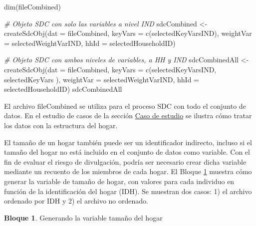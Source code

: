 \documentclass[
]{book}
\newenvironment{Shaded}{\begin{snugshade}}{\end{snugshade}}
\newcommand{\AttributeTok}[1]{\textcolor[rgb]{0.77,0.63,0.00}{#1}}
\newcommand{\CommentTok}[1]{\textcolor[rgb]{0.56,0.35,0.01}{\textit{#1}}}
\newcommand{\FunctionTok}[1]{\textcolor[rgb]{0.00,0.00,0.00}{#1}}
\newcommand{\NormalTok}[1]{#1}
\newcommand{\OtherTok}[1]{\textcolor[rgb]{0.56,0.35,0.01}{#1}}
\theoremstyle{definition}
\theoremstyle{definition}
\newtheorem{example}{Bloque}[chapter]
\theoremstyle{definition}
\theoremstyle{definition}
\theoremstyle{remark}
\begin{document}
\begin{Shaded}
\begin{Highlighting}[]
\FunctionTok{dim}\NormalTok{(fileCombined)}

\CommentTok{\# Objeto SDC con solo las variables a nivel IND}
\NormalTok{sdcCombined }\OtherTok{\textless{}{-}} \FunctionTok{createSdcObj}\NormalTok{(}\AttributeTok{dat =}\NormalTok{ fileCombined, }\AttributeTok{keyVars =} \FunctionTok{c}\NormalTok{(selectedKeyVarsIND),}
                            \AttributeTok{weightVar =}\NormalTok{ selectedWeightVarIND, }\AttributeTok{hhId =}\NormalTok{ selectedHouseholdID)}

\CommentTok{\# Objeto SDC con ambos niveles de variables, a HH y IND}
\NormalTok{sdcCombinedAll }\OtherTok{\textless{}{-}} \FunctionTok{createSdcObj}\NormalTok{(}\AttributeTok{dat =}\NormalTok{ fileCombined,}
                               \AttributeTok{keyVars =} \FunctionTok{c}\NormalTok{(selectedKeyVarsIND, selectedKeyVars ),}
                               \AttributeTok{weightVar =}\NormalTok{ selectedWeightVarIND, }
                               \AttributeTok{hhId =}\NormalTok{ selectedHouseholdID)}
\NormalTok{sdcCombinedAll}
\end{Highlighting}
\end{Shaded}

El archivo fileCombined se utiliza para el proceso SDC con todo el conjunto de datos. En el estudio de casos de la sección \protect\hyperlink{caso-de-estudio}{Caso de estudio} se ilustra cómo tratar los datos con la estructura del hogar.

El tamaño de un hogar también puede ser un identificador indirecto, incluso si el tamaño del hogar no está incluido en el conjunto de datos como variable. Con el fin de evaluar el riesgo de divulgación, podría ser necesario crear dicha variable mediante un recuento de los miembros de cada hogar. El Bloque \ref{exm:bloqueMicro14} muestra cómo generar la variable de tamaño de hogar, con valores para cada individuo en función de la identificación del hogar (IDH). Se muestran dos casos: 1) el archivo ordenado por IDH y 2) el archivo no ordenado.

\begin{example}
\protect\hypertarget{exm:bloqueMicro14}{}\label{exm:bloqueMicro14}Generando la variable tamaño del hogar
\end{example}
\end{document}
